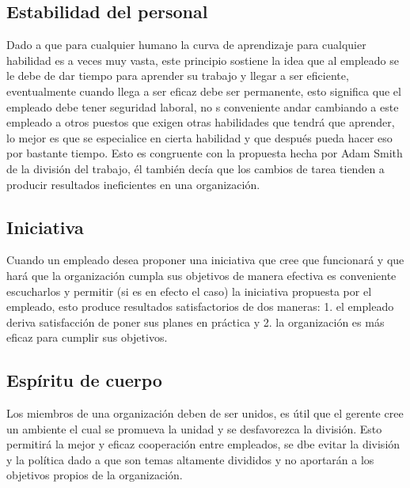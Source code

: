 \documentclass{article}
\begin{document}
\subsection{Estabilidad del personal}
Dado a que para cualquier humano la curva de aprendizaje para cualquier habilidad es a veces muy vasta, este principio sostiene la idea que al empleado se le debe de dar tiempo para aprender su trabajo y llegar a ser eficiente, eventualmente cuando llega a ser eficaz debe ser permanente, esto significa que el empleado debe tener seguridad laboral, no s conveniente andar cambiando a este empleado a otros puestos que exigen otras habilidades que tendrá que aprender, lo mejor es que se especialice en cierta habilidad y que después pueda hacer eso por bastante tiempo. Esto es congruente con la propuesta hecha por Adam Smith de la división del trabajo, él también decía que los cambios de tarea tienden a producir resultados ineficientes en una organización.

\subsection{Iniciativa}
Cuando un empleado desea proponer una iniciativa que cree que funcionará y que hará que la organización cumpla sus objetivos de manera efectiva es conveniente escucharlos y permitir (si es en efecto el caso) la iniciativa propuesta por el empleado, esto produce resultados satisfactorios de dos maneras: 1. el empleado deriva satisfacción de poner sus planes en práctica y 2. la organización es más eficaz para cumplir sus objetivos. 

\subsection{Espíritu de cuerpo}
Los miembros de una organización deben de ser unidos, es útil que el gerente cree un ambiente el cual se promueva la unidad y se desfavorezca la división. Esto permitirá la mejor y eficaz cooperación entre empleados, se dbe evitar la división y la política dado a que son temas altamente divididos y no aportarán a los objetivos propios de la organización.


\end{document}
